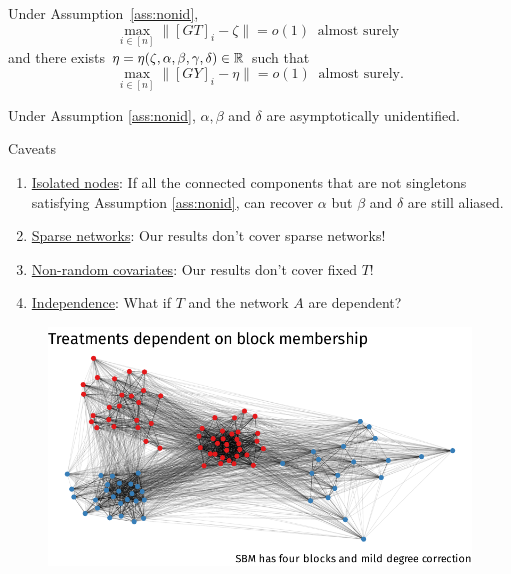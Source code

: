 \documentclass[aspectratio=169]{beamer}
\theoremstyle{remark}
\begin{document}
\begin{frame}

    \begin{lemma}[1] \label{thm:indepcov:nonid}
        Under Assumption~\ref{ass:nonid},
        \begin{equation*}
            \max_{i \in [n]} \Big\| [GT]_i - \zeta \Big\|
            = o(1) ~ \text{ almost surely }
        \end{equation*}
        and there exists $\eta = \eta(\zeta, \alpha, \beta, \gamma, \delta) \in \mathbb{R}$ such that
        \begin{equation*}
            \max_{i \in [n]} \Big\| [GY]_i - \eta \Big\|
            = o(1) ~ \text{ almost surely.}
        \end{equation*}
    \end{lemma}
    
    \begin{theorem}[1]
        \label{cor:indep}
        Under Assumption \ref{ass:nonid}, $\alpha, \beta$ and $\delta$ are asymptotically unidentified.
    \end{theorem}
\end{frame}

\begin{frame}{Caveats}
    \begin{enumerate}
        \item \underline{Isolated nodes}: If all the connected components that are not singletons satisfying Assumption \ref{ass:nonid}, can recover $\alpha$ but $\beta$ and $\delta$ are still aliased.
        \item \underline{Sparse networks}: Our results don't cover sparse networks!
        \item \underline{Non-random covariates}: Our results don't cover fixed $T$!
        \item \underline{Independence}: What if $T$ and the network $A$ are dependent?
    \end{enumerate}
\end{frame}

\begin{frame}
    \begin{figure}
        \centering
        \includegraphics{figures/simulations/defense-backbone-dependent.pdf}
    \end{figure}
\end{frame}
\end{document}
